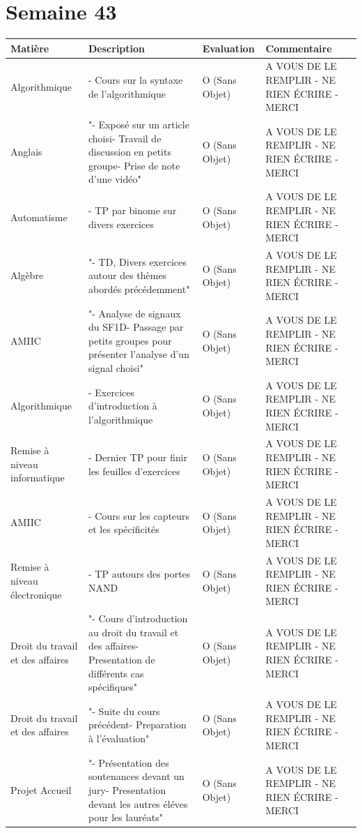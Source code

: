 \documentclass[12pt, openany]{report}
\begin{document}
\section*{Semaine 43}
\begin{tabular}{|l|l|l|l|}
\hline
Matière & Description & Evaluation & Commentaire \\ 
\hline
Algorithmique & - Cours sur la syntaxe de l'algorithmique & O (Sans Objet) & A VOUS DE LE REMPLIR - NE RIEN ÉCRIRE - MERCI \\ 
\hline
Anglais & "- Exposé sur un article choisi- Travail de discussion en petits groupe- Prise de note d'une vidéo" & O (Sans Objet) & A VOUS DE LE REMPLIR - NE RIEN ÉCRIRE - MERCI \\ 
\hline
Automatisme & - TP par binome sur divers exercices & O (Sans Objet) & A VOUS DE LE REMPLIR - NE RIEN ÉCRIRE - MERCI \\ 
\hline
Algèbre & "- TD, Divers exercices autour des thèmes abordés précédemment" & O (Sans Objet) & A VOUS DE LE REMPLIR - NE RIEN ÉCRIRE - MERCI \\ 
\hline
AMIIC & "- Analyse de signaux du SF1D- Passage par petits groupes pour présenter l'analyse d'un signal choisi" & O (Sans Objet) & A VOUS DE LE REMPLIR - NE RIEN ÉCRIRE - MERCI \\ 
\hline
Algorithmique & - Exercices d'introduction à l'algorithmique & O (Sans Objet) & A VOUS DE LE REMPLIR - NE RIEN ÉCRIRE - MERCI \\ 
\hline
Remise à niveau informatique & - Dernier TP pour finir les feuilles d'exercices & O (Sans Objet) & A VOUS DE LE REMPLIR - NE RIEN ÉCRIRE - MERCI \\ 
\hline
AMIIC & - Cours sur les capteurs et les spécificités & O (Sans Objet) & A VOUS DE LE REMPLIR - NE RIEN ÉCRIRE - MERCI \\ 
\hline
Remise à niveau électronique & - TP autours des portes NAND & O (Sans Objet) & A VOUS DE LE REMPLIR - NE RIEN ÉCRIRE - MERCI \\ 
\hline
Droit du travail et des affaires & "- Cours d'introduction au droit du travail et des affaires- Presentation de différents cas spécifiques" & O (Sans Objet) & A VOUS DE LE REMPLIR - NE RIEN ÉCRIRE - MERCI \\ 
\hline
Droit du travail et des affaires & "- Suite du cours précédent- Preparation à l'évaluation" & O (Sans Objet) & A VOUS DE LE REMPLIR - NE RIEN ÉCRIRE - MERCI \\ 
\hline
Projet Accueil & "- Présentation des soutenances devant un jury- Presentation devant les autres éléves pour les lauréats" & O (Sans Objet) & A VOUS DE LE REMPLIR - NE RIEN ÉCRIRE - MERCI \\ 

\end{tabular}
\end{document}
